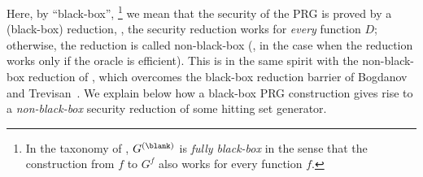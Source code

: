 \documentclass{toc}
\begin{document}
%
%
%
%
%
%
%
%
%
%
%
%
%
%
%
%
%
Here, by ``black-box'',%
\footnote{In the taxonomy of \cite{ReingoldTV04_tcc_conf}, $G^{(\blank)}$ is \emph{fully black-box}
  in the sense that the construction from $f$ to $G^f$ also works for every function $f$.}
we mean that the security of the PRG is proved by a (black-box) reduction, \ie,
the security reduction works for \emph{every} function $D$;
otherwise, the reduction is called non-black-box (\eg, in the case when the reduction works only if the oracle is efficient).
This is in the same spirit with the non-black-box reduction of \cite{Hirahara18_focs_conf},
which overcomes the black-box reduction barrier of Bogdanov and Trevisan~\cite{BogdanovT06_siamcomp_journals}.
We explain below how a black-box PRG construction gives rise to a \emph{non-black-box} security reduction of some
hitting set generator.

%
%
%
%
%
%
%
%
%
%
%
%
%
%
%
%
%
%
\end{document}
